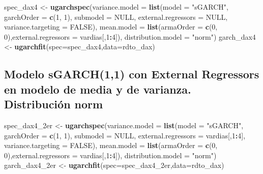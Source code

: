 \documentclass[
  11pt,
]{article}
\newenvironment{Shaded}{\begin{snugshade}}{\end{snugshade}}
\newcommand{\DataTypeTok}[1]{\textcolor[rgb]{0.13,0.29,0.53}{#1}}
\newcommand{\DecValTok}[1]{\textcolor[rgb]{0.00,0.00,0.81}{#1}}
\newcommand{\KeywordTok}[1]{\textcolor[rgb]{0.13,0.29,0.53}{\textbf{#1}}}
\newcommand{\NormalTok}[1]{#1}
\newcommand{\OperatorTok}[1]{\textcolor[rgb]{0.81,0.36,0.00}{\textbf{#1}}}
\newcommand{\OtherTok}[1]{\textcolor[rgb]{0.56,0.35,0.01}{#1}}
\newcommand{\StringTok}[1]{\textcolor[rgb]{0.31,0.60,0.02}{#1}}
\begin{document}
\begin{Shaded}
\begin{Highlighting}[]
\NormalTok{spec_dax4 <-}\StringTok{ }\KeywordTok{ugarchspec}\NormalTok{(}\DataTypeTok{variance.model =} \KeywordTok{list}\NormalTok{(}\DataTypeTok{model =} \StringTok{"sGARCH"}\NormalTok{, }\DataTypeTok{garchOrder =} \KeywordTok{c}\NormalTok{(}\DecValTok{1}\NormalTok{, }\DecValTok{1}\NormalTok{), }
                    \DataTypeTok{submodel =} \OtherTok{NULL}\NormalTok{, }\DataTypeTok{external.regressors =} \OtherTok{NULL}\NormalTok{, }\DataTypeTok{variance.targeting =} \OtherTok{FALSE}\NormalTok{), }
                    \DataTypeTok{mean.model =} \KeywordTok{list}\NormalTok{(}\DataTypeTok{armaOrder =} \KeywordTok{c}\NormalTok{(}\DecValTok{0}\NormalTok{, }\DecValTok{0}\NormalTok{),}\DataTypeTok{external.regressors =}\NormalTok{ vardias[,}\DecValTok{1}\OperatorTok{:}\DecValTok{4}\NormalTok{]),}
               \DataTypeTok{distribution.model =} \StringTok{"norm"}\NormalTok{)}
\NormalTok{garch_dax4 <-}\StringTok{ }\KeywordTok{ugarchfit}\NormalTok{(}\DataTypeTok{spec=}\NormalTok{spec_dax4,}\DataTypeTok{data=}\NormalTok{rdto_dax)}
\end{Highlighting}
\end{Shaded}

\hypertarget{modelo-sgarch11-con-external-regressors-en-modelo-de-media-y-de-varianza.-distribuciuxf3n-norm}{%
\subsection{Modelo sGARCH(1,1) con External Regressors en modelo de
media y de varianza. Distribución
norm}\label{modelo-sgarch11-con-external-regressors-en-modelo-de-media-y-de-varianza.-distribuciuxf3n-norm}}

\begin{Shaded}
\begin{Highlighting}[]
\NormalTok{spec_dax4_2er <-}\StringTok{ }\KeywordTok{ugarchspec}\NormalTok{(}\DataTypeTok{variance.model =} \KeywordTok{list}\NormalTok{(}\DataTypeTok{model =} \StringTok{"sGARCH"}\NormalTok{, }\DataTypeTok{garchOrder =} \KeywordTok{c}\NormalTok{(}\DecValTok{1}\NormalTok{, }\DecValTok{1}\NormalTok{), }
                    \DataTypeTok{submodel =} \OtherTok{NULL}\NormalTok{, }\DataTypeTok{external.regressors =}\NormalTok{ vardias[,}\DecValTok{1}\OperatorTok{:}\DecValTok{4}\NormalTok{], }\DataTypeTok{variance.targeting =} \OtherTok{FALSE}\NormalTok{), }
                    \DataTypeTok{mean.model =} \KeywordTok{list}\NormalTok{(}\DataTypeTok{armaOrder =} \KeywordTok{c}\NormalTok{(}\DecValTok{0}\NormalTok{, }\DecValTok{0}\NormalTok{),}\DataTypeTok{external.regressors =}\NormalTok{ vardias[,}\DecValTok{1}\OperatorTok{:}\DecValTok{4}\NormalTok{]),}
               \DataTypeTok{distribution.model =} \StringTok{"norm"}\NormalTok{)}
\NormalTok{garch_dax4_2er <-}\StringTok{ }\KeywordTok{ugarchfit}\NormalTok{(}\DataTypeTok{spec=}\NormalTok{spec_dax4_2er,}\DataTypeTok{data=}\NormalTok{rdto_dax)}
\end{Highlighting}
\end{Shaded}
\end{document}
